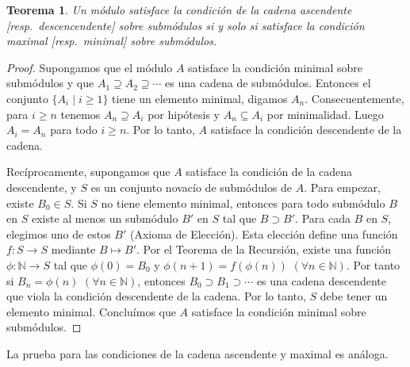 \documentclass{report}
\newcommand{\naturalNumbers}{\mathbb{N}}
\newtheorem{theorem}{Teorema}
\begin{document}
  \begin{theorem}\label{theorem:equivalenceOfChainConditions}
    Un módulo satisface la condición de la cadena ascendente [resp.\ descencendente] sobre submódulos si y solo si satisface la condición maximal [resp.\ minimal] sobre submódulos.
  \end{theorem}
  \begin{proof}
    Supongamos que el módulo \(A\) satisface la condición minimal sobre submódulos y que \(A_1 \supseteq A_2 \supseteq \cdots\) es una cadena de submódulos.
    Entonces el conjunto \(\{A_i \mid i \geq 1\}\) tiene un elemento minimal, digamos \(A_n\).
    Consecuentemente, para \(i \geq n\) tenemos \(A_n \supseteq A_i\) por hipótesis y \(A_n \subseteq A_i\) por minimalidad. Luego \(A_i = A_n\) para todo \(i \geq n\).
    Por lo tanto, \(A\) satisface la condición descendente de la cadena.

    Recíprocamente, supongamos que \(A\) satisface la condición de la cadena descendente, y \(S\) es un conjunto novacío de submódulos de \(A\).
    Para empezar, existe \(B_0 \in S\).
    Si \(S\) no tiene elemento minimal, entonces para todo submódulo \(B\) en \(S\) existe al menos un submódulo \(B'\) en \(S\) tal que \(B \supset B'\).
    Para cada \(B\) en \(S\), elegimos uno de estos \(B'\) (Axioma de Elección).
    Esta elección define una función \(f : S \rightarrow S\) mediante \(B \mapsto B'\).
    Por el Teorema de la Recursión, existe una función \(\phi : \naturalNumbers \rightarrow S\) tal que \(\phi(0) = B_0\) y \(\phi(n + 1) = f(\phi(n))\) \((\forall n \in \naturalNumbers)\).
    Por tanto si \(B_n = \phi(n)\) \((\forall n \in \naturalNumbers)\), entonces \(B_0 \supset B_1 \supset \cdots\) es una cadena descendente que viola la condición descendente de la cadena.
    Por lo tanto, \(S\) debe tener un elemento minimal.
    Concluímos que \(A\) satisface la condición minimal sobre submódulos.
  \end{proof}
  La prueba para las condiciones de la cadena ascendente y maximal es análoga.
\end{document}
